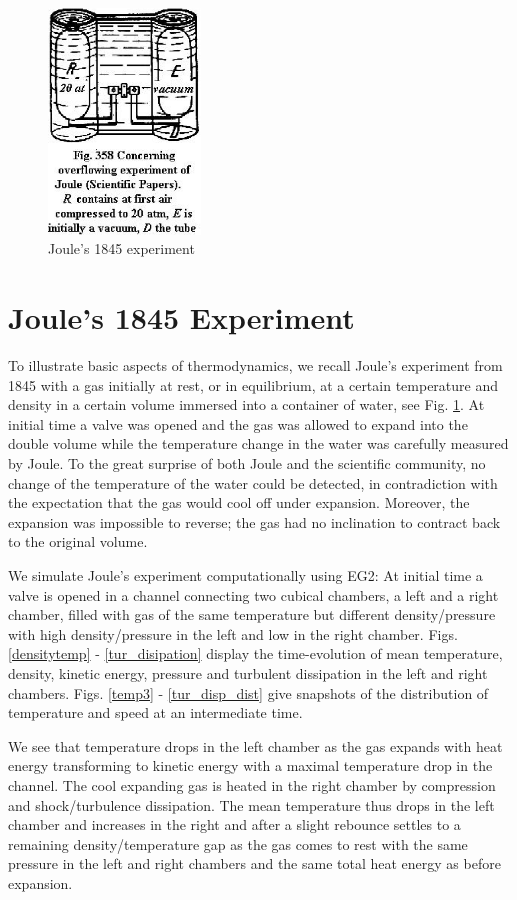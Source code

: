 \begin{figure}[bhpt]
\centerline{
 \includegraphics[height=6cm]{chapters/hoffman-3/eps/fig358.eps}
}
\caption{Joule's 1845 experiment}
\label{joule}
\end{figure}


\section{Joule's 1845 Experiment}

To illustrate basic aspects of thermodynamics,
we recall Joule's experiment from 1845 with a gas initially
at rest, or in equilibrium, at a certain temperature and density
in a certain volume immersed into a container of water, see
Fig. \ref{joule}. At initial time a valve was opened and the
gas was allowed to expand into the double volume while the temperature
change in the water was carefully measured by Joule.
To the great surprise of both Joule and the scientific community, no change
of the temperature of the water could be detected, in contradiction with
the expectation that the gas would cool off under expansion.
Moreover, the expansion was impossible to reverse; the gas had no inclination
to contract back to the original volume.

We simulate Joule's experiment computationally using EG2: At initial time a
valve is opened in a channel connecting
two cubical chambers, a left and a right chamber, filled with gas of the same
temperature but different
density/pressure with high density/pressure in the left and low in the right
chamber.
Figs. \ref{densitytemp} - \ref{tur_disipation} display the time-evolution of
mean temperature, density, kinetic
energy, pressure and turbulent dissipation in the left and right chambers. Figs.
\ref{temp3} - \ref{tur_disp_dist} give snapshots of the distribution of
temperature and speed at an intermediate time.

We see that temperature drops in the left chamber as the gas expands with heat
energy transforming to kinetic energy
with a maximal temperature drop in the channel. The cool expanding gas is
heated  in the right chamber by compression and shock/turbulence dissipation.
The mean temperature thus drops in the left chamber and
increases in the right and
after a slight rebounce settles to a remaining density/temperature gap as the
gas comes to rest with the same pressure
in the left and right chambers and the same total heat energy as before
expansion.

